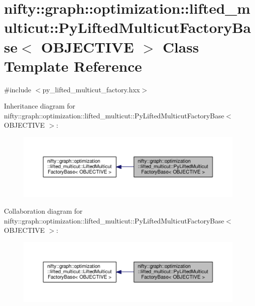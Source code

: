 \hypertarget{classnifty_1_1graph_1_1optimization_1_1lifted__multicut_1_1PyLiftedMulticutFactoryBase}{}\section{nifty\+:\+:graph\+:\+:optimization\+:\+:lifted\+\_\+multicut\+:\+:Py\+Lifted\+Multicut\+Factory\+Base$<$ O\+B\+J\+E\+C\+T\+I\+V\+E $>$ Class Template Reference}
\label{classnifty_1_1graph_1_1optimization_1_1lifted__multicut_1_1PyLiftedMulticutFactoryBase}


{\ttfamily \#include $<$py\+\_\+lifted\+\_\+multicut\+\_\+factory.\+hxx$>$}



Inheritance diagram for nifty\+:\+:graph\+:\+:optimization\+:\+:lifted\+\_\+multicut\+:\+:Py\+Lifted\+Multicut\+Factory\+Base$<$ O\+B\+J\+E\+C\+T\+I\+V\+E $>$\+:\nopagebreak
\begin{figure}[H]
\begin{center}
\leavevmode
\includegraphics[width=350pt]{classnifty_1_1graph_1_1optimization_1_1lifted__multicut_1_1PyLiftedMulticutFactoryBase__inherit__graph}
\end{center}
\end{figure}


Collaboration diagram for nifty\+:\+:graph\+:\+:optimization\+:\+:lifted\+\_\+multicut\+:\+:Py\+Lifted\+Multicut\+Factory\+Base$<$ O\+B\+J\+E\+C\+T\+I\+V\+E $>$\+:\nopagebreak
\begin{figure}[H]
\begin{center}
\leavevmode
\includegraphics[width=350pt]{classnifty_1_1graph_1_1optimization_1_1lifted__multicut_1_1PyLiftedMulticutFactoryBase__coll__graph}
\end{center}
\end{figure}
